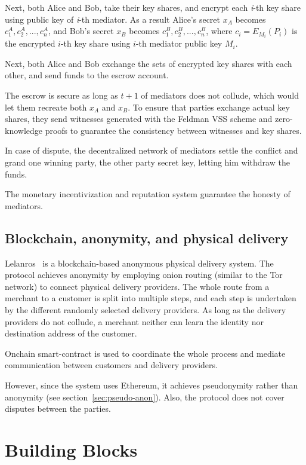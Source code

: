\documentclass{ieeeaccess}
\begin{document}
Next, both Alice and Bob, take their key shares, and encrypt each
\textit{i}-th key share using public key of \textit{i}-th mediator. As a result
Alice's secret \(x_A\) becomes \({c^A_1, c^A_2,...,c^A_n}\), and Bob's
secret \(x_B\) becomes \({c^B_1, c^B_2,...,c^B_n}\), where
\(c_i = E_{M_i}(P_i)\) is the encrypted \(i\)-th key share using
\(i\)-th mediator public key \(M_i\).

Next, both Alice and Bob exchange the sets of encrypted key shares with
each other, and send funds to the escrow account.

The escrow is secure as long as \(t+1\) of mediators does not collude,
which would let them recreate both \(x_A\) and \(x_B\). To ensure
that parties exchange actual key shares, they send witnesses
generated with the Feldman VSS scheme and zero-knowledge proofs to guarantee the consistency between witnesses and key shares.

In case of dispute, the decentralized network of mediators settle the conflict and grand one winning party, the other party secret key,
letting him withdraw the funds.

The monetary incentivization and reputation system guarantee the honesty of mediators.

\subsection{Blockchain, anonymity, and physical delivery}\label{lelantos-a-blockchain-based-anonymous-physical-delivery-system}

Lelanros~\cite{altawyLelantosBlockchainBasedAnonymous2017} is a blockchain-based anonymous
physical delivery system. The protocol achieves anonymity by employing onion routing (similar to the Tor network) to connect physical delivery providers. The whole route from a merchant to a customer is split into multiple steps, and each step is undertaken by the different randomly selected delivery providers. As long as the delivery providers do not collude, a merchant neither can learn the identity nor destination address of the customer.

Onchain smart-contract is used to coordinate the whole process and
mediate communication between customers and delivery providers.

However, since the system uses Ethereum, it achieves pseudonymity rather than anonymity (see section~\ref{sec:pseudo-anon}). Also, the protocol does not cover disputes between the parties.
 
\section{Building Blocks}\label{sec:building-blocks}
\end{document}
